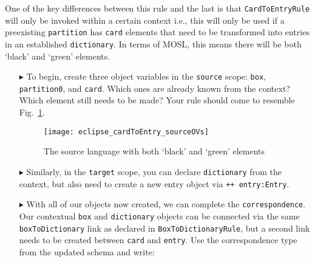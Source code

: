 One of the key differences between this rule and the last is that \texttt{CardToEntryRule} will only be invoked within a certain context i.e.,
this will only be used if a preexisting \texttt{partition} has \texttt{card} elements that need to be transformed into entries in an established
\texttt{dictionary}. In terms of MOSL, this means there will be both `black' and `green' elements.

\begin{itemize}

\item[$\blacktriangleright$] To begin, create three object variables in the \texttt{source} scope: \texttt{box}, \texttt{partition0}, and \texttt{card}. Which
ones are already known from the context? Which element still needs to be made? Your rule should come to resemble Fig.~\ref{fig:c2eRuleSource}.

\begin{figure}[htbp]
\begin{center}
  \texttt{[image: eclipse\_cardToEntry\_sourceOVs]}
  \caption{The source language with both `black' and `green' elements}
  \label{fig:c2eRuleSource}
\end{center}
\end{figure}

\item[$\blacktriangleright$] Similarly, in the \texttt{target} scope, you can declare \texttt{dictionary} from the context, but also need to create a new
entry object via \texttt{++ entry:Entry}. 

\vspace{0.5cm}

\item[$\blacktriangleright$] With all of our objects now created, we can complete the \texttt{correspondence}. Our contextual \texttt{box} and
\texttt{dictionary} objects can be connected via the same \texttt{boxToDictionary} link as declared in \texttt{BoxToDictionaryRule}, but a second link needs to
be created between \texttt{card} and \texttt{entry}. Use the correspondence type from the updated schema and write: 



\end{itemize}
